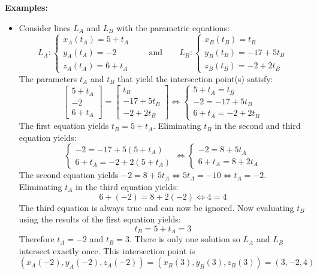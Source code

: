 \documentclass{article}
\begin{document}
\textbf{Examples:}
\begin{itemize}
\item Consider lines \(L_A\) and \(L_B\) with the parametric equations:
\[L_A : \left\{\begin{array}{l}
x_A(t_A) = 5 + t_A \\ 
y_A(t_A) = -2 \\ 
z_A(t_A) = 6 + t_A
\end{array}\right.
\quad\quad\text{and}\quad\quad 
L_B : \left\{\begin{array}{l}
x_B(t_B) = t_B \\ 
y_B(t_B) = -17 + 5t_B \\ 
z_B(t_B) = -2 + 2t_B 
\end{array}\right.\]
The parameters \(t_A\) and \(t_B\) that yield the intersection point(s) satisfy:
\[\begin{bmatrix}
5 + t_A \\ 
-2 \\ 
6 + t_A 
\end{bmatrix} = \begin{bmatrix} 
t_B \\ 
-17 + 5t_B \\ 
-2 + 2t_B
\end{bmatrix} \iff 
\left\{\begin{array}{l}
5 + t_A = t_B \\ 
-2 = -17 + 5t_B \\ 
6 + t_A = -2 + 2t_B
\end{array}\right.\]
The first equation yields \(t_B = 5 + t_A\). Eliminating \(t_B\) in the second and third equation yields: 
\[\left\{\begin{array}{l}
-2 = -17 + 5(5 + t_A) \\ 
6 + t_A = -2 + 2(5 + t_A)
\end{array}\right. \iff \left\{\begin{array}{l}
-2 = 8 + 5t_A \\ 
6 + t_A = 8 + 2t_A
\end{array}\right.\]
The second equation yields \(-2 = 8 + 5t_A \iff 5t_A = -10 \iff t_A = -2\). Eliminating \(t_A\) in the third equation yields: 
\[6 + (-2) = 8 + 2(-2) \iff 4 = 4\]
The third equation is always true and can now be ignored. Now evaluating \(t_B\) using the results of the first equation yields: 
\[t_B = 5 + t_A = 3\]
Therefore \(t_A = -2\) and \(t_B = 3\). There is only one solution so \(L_A\) and \(L_B\) intersect exactly once. This intersection point is 
\[(x_A(-2), y_A(-2), z_A(-2)) = (x_B(3), y_B(3), z_B(3)) = (3, -2, 4)\]

\end{itemize}
\end{document}
